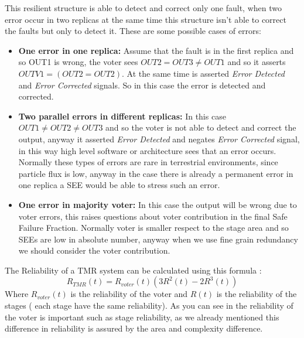 {{{{        		This resilient structure is able to detect and correct only one fault, when two error occur in two replicas at the same time this structure isn't able to correct the faults but only to detect it.
        		These are some possible cases of errors:
        		\begin{itemize}
        		    \item \textbf{One error in one replica:} Assume that the fault is in the first replica and so OUT1 is wrong, the voter sees $OUT2=OUT3\neq OUT1$ and so it asserts $OUTV1 = (OUT2=OUT2)$. At the same time is asserted \textit{Error Detected} and \textit{Error Corrected} signals. So in this case the error is detected and corrected.
        		    \item \textbf{Two parallel errors in different replicas:} In this case $OUT1\neq OUT2 \neq OUT3$ and so the voter is not able to detect and correct the output, anyway it asserted \textit{Error Detected} and negates \textit{Error Corrected} signal, in this way high level software or architecture sees that an error occurs. Normally these types of errors are rare in terrestrial environments, since particle flux is low, anyway in the case there is already a permanent error in one replica a SEE would be able to stress such an error. 
        		    \item \textbf{One error in majority voter:} In this case the output will be wrong due to voter errors, this raises questions about voter contribution in the final Safe Failure Fraction. Normally voter is smaller respect to the stage area and so SEEs are low in absolute number, anyway when we use fine grain redundancy we should consider the voter contribution.
        		\end{itemize}
        		
        		The Reliability of a TMR system can be calculated using this formula :
        		\begin{equation}
        		    \label{eq:R_TMR}
        		     R_{TMR}(t) = R_{voter}(t)\left( 3 R^2(t) - 2R^3(t) \right)
        		\end{equation} 
        		Where $R_{voter}(t)$ is the reliability of the voter and $R(t)$ is the reliability of the stages ( each stage have the same reliability). As you can see in  the reliability of the voter is important such as stage reliability, as we already mentioned this difference in reliability is assured by the area and complexity difference. 
    		    
}}}}
